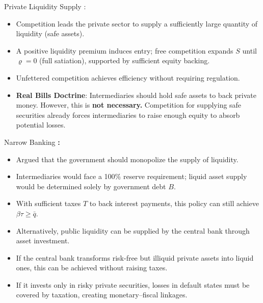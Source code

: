 \documentclass[11pt,aspectratio=169]{beamer}
\begin{document}
\begin{frame}{Private Liquidity Supply}
\small
\textbf{\textcite{Hayek1976Denationalization}}:
\begin{itemize}
\item  Competition leads the private sector to supply a sufficiently large quantity of liquidity (safe assets).

    \item A positive liquidity premium induces entry; free competition expands $S$ until $\varrho = 0$ (full satiation), supported by sufficient equity backing.
    \item Unfettered competition achieves efficiency without requiring regulation.
    \item \textbf{Real Bills Doctrine}: Intermediaries should hold safe assets to back private money. However, this is \textbf{not necessary.} Competition for supplying safe securities already forces intermediaries to raise enough equity to absorb potential losses.
\end{itemize}
\end{frame}

\begin{frame}{Narrow Banking}
\small
\textbf{\textcite{friedman1960program}:}
\begin{itemize}
 \item Argued that the government should monopolize the supply of liquidity.
    \item Intermediaries would face a 100\% reserve requirement; liquid asset supply would be determined solely by government debt $B$.
    \item With sufficient taxes $T$ to back interest payments, this policy can still achieve $\beta \tau \ge \bar{q}$.

\item Alternatively, public liquidity can be supplied by the central bank through asset investment.
    \item If the central bank transforms risk-free but illiquid private assets into liquid ones, this can be achieved without raising taxes.
    \item If it invests only in risky private securities, losses in default states must be covered by taxation, creating monetary–fiscal linkages.
\end{itemize}
\end{frame}
\end{document}
